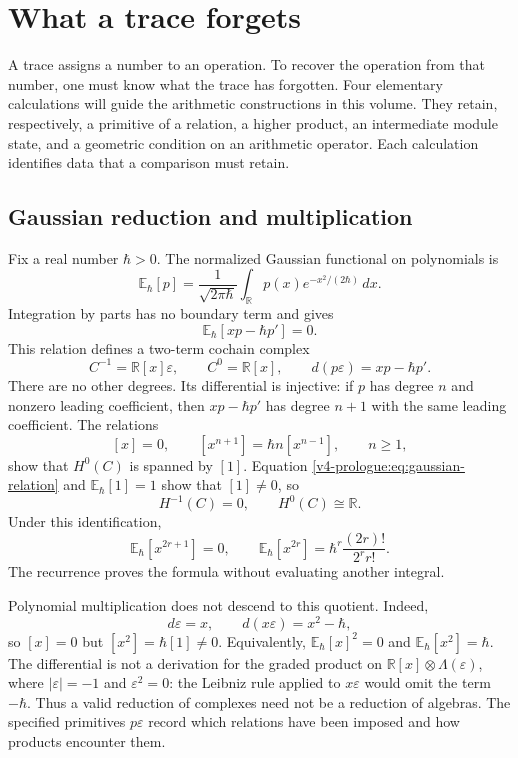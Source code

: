 \chapter*{What a trace forgets}
{}
\label{v4-ch:trace-prologue}

A trace assigns a number to an operation. To recover the operation from
that number, one must know what the trace has forgotten. Four elementary
calculations will guide the arithmetic constructions in this volume.
They retain, respectively, a primitive of a relation, a higher product,
an intermediate module state, and a geometric condition on an arithmetic
operator. Each calculation identifies data that a comparison must retain.

\section*{Gaussian reduction and multiplication}
\label{v4-prologue:gaussian}

Fix a real number \(\hbar>0\). The normalized Gaussian functional on
polynomials is
\[
 \mathbb E_\hbar[p]
 =\frac{1}{\sqrt{2\pi\hbar}}
   \int_{\mathbb R}p(x)e^{-x^2/(2\hbar)}\,dx.
\]
Integration by parts has no boundary term and gives
\begin{equation}\label{v4-prologue:eq:gaussian-relation}
 \mathbb E_\hbar[xp-\hbar p']=0.
\end{equation}
This relation defines a two-term cochain complex
\[
 C^{-1}=\mathbb R[x]\varepsilon,
 \qquad C^0=\mathbb R[x],
 \qquad d(p\varepsilon)=xp-\hbar p'.
\]
There are no other degrees. Its differential is injective: if \(p\)
has degree \(n\) and nonzero leading coefficient, then \(xp-\hbar p'\)
has degree \(n+1\) with the same leading coefficient. The relations
\[
 [x]=0,\qquad
 [x^{n+1}]=\hbar n[x^{n-1}],\qquad n\ge1,
\]
show that \(H^0(C)\) is spanned by \([1]\). Equation
\eqref{v4-prologue:eq:gaussian-relation} and
\(\mathbb E_\hbar[1]=1\) show that \([1]\ne0\), so
\[
 H^{-1}(C)=0,\qquad H^0(C)\cong\mathbb R.
\]
Under this identification,
\begin{equation}\label{v4-prologue:eq:moments}
 \mathbb E_\hbar[x^{2r+1}]=0,
 \qquad
 \mathbb E_\hbar[x^{2r}]
 =\hbar^r\frac{(2r)!}{2^r r!}.
\end{equation}
The recurrence proves the formula without evaluating another integral.

Polynomial multiplication does not descend to this quotient. Indeed,
\[
 d\varepsilon=x,\qquad
 d(x\varepsilon)=x^2-\hbar,
\]
so \([x]=0\) but \([x^2]=\hbar[1]\ne0\). Equivalently,
\(\mathbb E_\hbar[x]^2=0\) and
\(\mathbb E_\hbar[x^2]=\hbar\). The differential is not a derivation
for the graded product on \(\mathbb R[x]\otimes\Lambda(\varepsilon)\),
where \(|\varepsilon|=-1\) and \(\varepsilon^2=0\): the
Leibniz rule applied to \(x\varepsilon\) would omit the term
\(-\hbar\). Thus a valid reduction of complexes need not be a
reduction of algebras. The specified primitives \(p\varepsilon\)
record which relations have been imposed and how products encounter
them.

